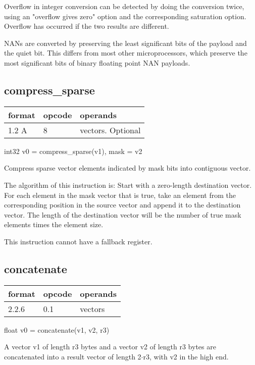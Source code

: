 \documentclass[forwardcom.tex]{subfiles}
\begin{document}
Overflow in integer conversion can be detected by doing the conversion twice, using an "overflow gives zero" option and the corresponding saturation option. Overflow has occurred if the two results are different.
\vv

NANs are converted by preserving the least significant bits of the payload and the quiet bit. This differs from most other microprocessors, which preserve the most significant bits of binary floating point NAN payloads.
\vv


\subsection{compress\_sparse}
\label{table:compressSparseInstruction}
\begin{tabular}{|p{12mm}|p{15mm}|p{100mm}|}
\hline
\bfseries format & \bfseries opcode & \bfseries operands \\ \hline
1.2 A & 8 & vectors. Optional \\ \hline
\end{tabular}
\vv

int32 v0 = compress\_sparse(v1), mask = v2
\vv

Compress sparse vector elements indicated by mask bits into contiguous vector. 
\vv

The algorithm of this instruction is:
Start with a zero-length destination vector.
For each element in the mask vector that is true, take an element from the corresponding position in the source vector and append it to the destination vector.
The length of the destination vector will be the number of true mask elements
times the element size.
\vv

This instruction cannot have a fallback register.
\vv


\subsection{concatenate}
\label{table:concatenateInstruction}
\begin{tabular}{|p{12mm}|p{15mm}|p{100mm}|}
\hline
\bfseries format & \bfseries opcode & \bfseries operands \\ \hline
2.2.6 & 0.1 & vectors \\ \hline
\end{tabular}
\vv

float v0 = concatenate(v1, v2, r3)
\vv

A vector v1 of length r3 bytes and a vector v2 of
length r3 bytes are concatenated into a result vector
of length 2$\cdot$r3, with v2 in the high end.
\vv
\end{document}
